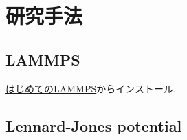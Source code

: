 \chapter{研究手法}

\section{LAMMPS}

\href{https://qiita.com/m-agnet/items/4871bff968bbdace897b}{はじめてのLAMMPS}からインストール. 



\section{Lennard-Jones potential}

